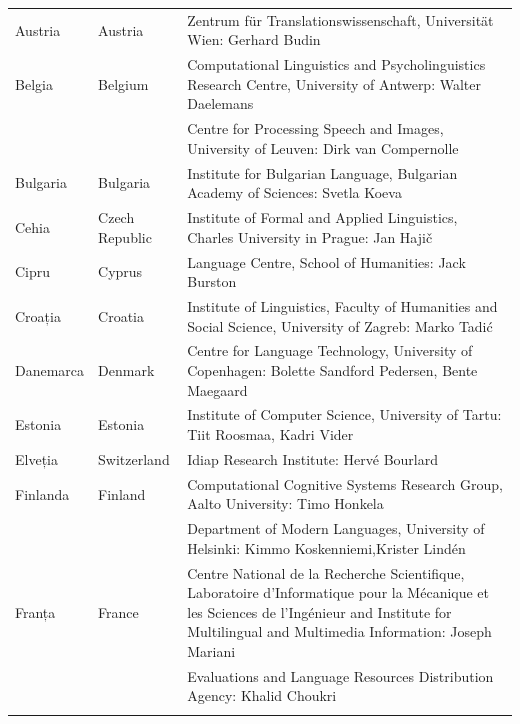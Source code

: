 \small
\begin{longtable}{@{}llp{113mm}@{}}
  Austria & \textcolor{grey1}{Austria} & Zentrum für Translationswissenschaft, Universität Wien: Gerhard Budin\\ \addlinespace 
  Belgia & \textcolor{grey1}{Belgium} & Computational Linguistics and Psycholinguistics Research Centre, University of Antwerp: Walter Daelemans\\ \addlinespace
  & & Centre for Processing Speech and Images, University of Leuven: Dirk van Compernolle \\ \addlinespace
  Bulgaria & \textcolor{grey1}{Bulgaria} & Institute for Bulgarian Language, Bulgarian Academy of Sciences: Svetla Koeva \\ \addlinespace
  Cehia & \textcolor{grey1}{Czech Republic} & Institute of Formal and Applied Linguistics, Charles University in Prague: Jan Hajič \\ \addlinespace
  Cipru & \textcolor{grey1}{Cyprus} & Language Centre, School of Humanities: Jack Burston \\ \addlinespace
  Croația & \textcolor{grey1}{Croatia} & Institute of Linguistics, Faculty of Humanities and Social Science, University of Zagreb: Marko Tadić \\ \addlinespace
  Danemarca &  \textcolor{grey1}{Denmark} & Centre for Language Technology, University of Copenhagen: \newline Bolette Sandford Pedersen, Bente Maegaard\\ \addlinespace
  Estonia & \textcolor{grey1}{Estonia} & Institute of Computer Science, University of Tartu: Tiit Roosmaa, Kadri Vider\\ \addlinespace
  Elveția & \textcolor{grey1}{Switzerland} & Idiap Research Institute: Hervé Bourlard \\ \addlinespace 
  Finlanda & \textcolor{grey1}{Finland} & Computational Cognitive Systems Research Group, Aalto University: Timo Honkela\\ \addlinespace
  & & Department of Modern Languages, University of Helsinki: Kimmo Koskenniemi,\newline Krister Lindén \\ \addlinespace
  Franța & \textcolor{grey1}{France} & Centre National de la Recherche Scientifique, Laboratoire d'Informatique pour la Mécanique et les Sciences de l'Ingénieur and Institute for Multilingual and Multimedia Information: Joseph Mariani \\ \addlinespace
  & & Evaluations and Language Resources Distribution Agency: Khalid Choukri\\ \addlinespace 

\end{longtable}
